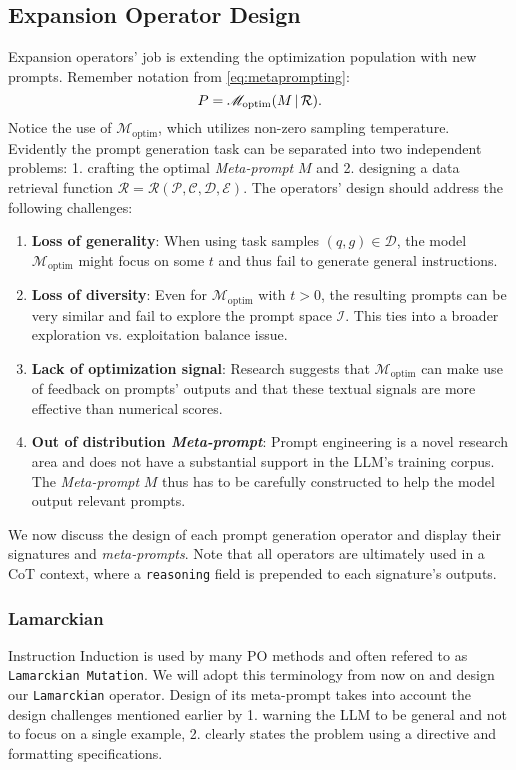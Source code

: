 \subsection{Expansion Operator Design}
Expansion operators' job is extending the optimization population with new prompts. Remember notation from \ref{eq:metaprompting}:
\begin{equation*}
    P = \mathscr{M}_{\text{optim}}(M\, \vert \, \mathcal{R}).
\end{equation*}
Notice the use of $\mathscr{M}_{\text{optim}}$, which utilizes non-zero sampling temperature. Evidently the prompt generation task can be separated into two independent problems: 1. crafting the optimal \textit{Meta-prompt} $M$ 
and 2. designing a data retrieval function $\mathcal{R} = \mathcal{R}(\mathcal{P}, \mathcal{C}, \mathcal{D}, \mathcal{E})$.
The operators' design should address the following challenges:
\begin{enumerate}
    \item \textbf{Loss of generality}: When using task samples $(q, g) \in \mathcal{D}$, the model $\mathcal{M}_{\text{optim}}$ might focus on some $t$ and thus fail to generate general instructions.
    \item \textbf{Loss of diversity}: Even for  $\mathscr{M}_{\text{optim}}$ with $t>0$, the resulting prompts can be very similar and fail to explore the prompt space $\mathcal{I}$. 
    This ties into a broader exploration vs. exploitation balance issue.
    \item \textbf{Lack of optimization signal}: Research\cite{he2024crispomultiaspectcritiquesuggestionguidedautomatic}\cite{xiang2025selfsupervisedpromptoptimization} suggests that $\mathcal{M}_{\text{optim}}$ 
    can make use of feedback on prompts' outputs and that these textual signals are more effective than numerical scores.
    \item \textbf{Out of distribution \textit{Meta-prompt}}: Prompt engineering is a novel research area and does not have a substantial support in the LLM's training corpus.
    The \textit{Meta-prompt} $M$ thus has to be carefully constructed to help the model output relevant prompts.
\end{enumerate}

We now discuss the design of each prompt generation operator and display their signatures and \textit{meta-prompts}. 
Note that all operators are ultimately used in a CoT context, where a \texttt{reasoning} field is prepended to each signature's outputs.
\subsubsection{Lamarckian}
Instruction Induction\cite{honovich2022instructioninductionexamplesnatural} is used by many PO methods and often refered to as \texttt{Lamarckian Mutation}. 
We will adopt this terminology from now on and design our \texttt{Lamarckian} operator. 
Design of its meta-prompt takes into account the design challenges mentioned earlier by 1. warning the LLM to be general and not to focus on a single example, 
2. clearly states the problem using a directive and formatting specifications. 

